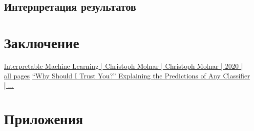 \documentclass[a4paper, 12pt]{article}
\begin{document}
	\subsection{Интерпретация результатов}
	
	\newpage
	
	\section{Заключение}
	
	\newpage
	
	\begin{thebibliography}{99}
		\href{https://christophm.github.io/interpretable-ml-book/}{Interpretable Machine Learning | Christoph Molnar | Christoph Molnar | 2020 | all pages}
		\href{https://arxiv.org/pdf/1602.04938.pdf}{“Why Should I Trust You?” Explaining the Predictions of Any Classifier
| ...}
	\end{thebibliography}
	\newpage
	
	\section{Приложения}
	
\end{document}
